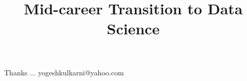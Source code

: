 \documentclass[xcolor=dvipsnames,compress,t,pdf,9pt]{beamer}
\title[\insertframenumber /\inserttotalframenumber]{Mid-career Transition to Data Science}
\begin{document}
	\begin{frame}
	\titlepage
	\end{frame}
	
%	
	
	
	\begin{frame}[c]{}
	Thanks ...
	\vspace{5mm}
	yogeshkulkarni@yahoo.com
	\end{frame}
\end{document}
